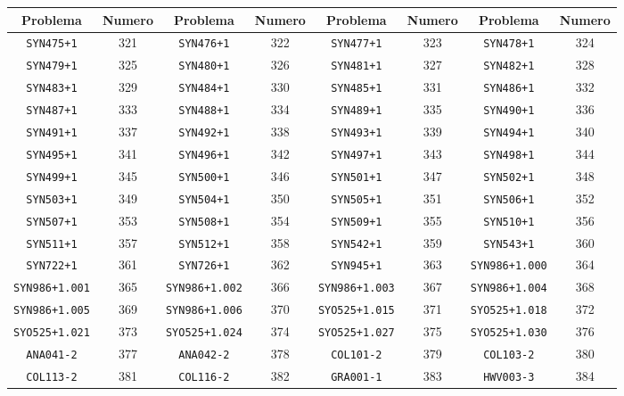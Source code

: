 \documentclass[./main.tex]{subfiles}
\begin{document}
\begin{table}[H]
\begin{tabular}{|c|c|c|c|c|c|c|c|}
\hline
Problema & Numero & Problema & Numero & Problema & Numero & Problema & Numero \\
\hline
\texttt{SYN475+1} & 321 & \texttt{SYN476+1} & 322 & \texttt{SYN477+1} & 323 & \texttt{SYN478+1} & 324\\
\hline
\texttt{SYN479+1} & 325 & \texttt{SYN480+1} & 326 & \texttt{SYN481+1} & 327 & \texttt{SYN482+1} & 328\\
\hline
\texttt{SYN483+1} & 329 & \texttt{SYN484+1} & 330 & \texttt{SYN485+1} & 331 & \texttt{SYN486+1} & 332\\
\hline
\texttt{SYN487+1} & 333 & \texttt{SYN488+1} & 334 & \texttt{SYN489+1} & 335 & \texttt{SYN490+1} & 336\\
\hline
\texttt{SYN491+1} & 337 & \texttt{SYN492+1} & 338 & \texttt{SYN493+1} & 339 & \texttt{SYN494+1} & 340\\
\hline
\texttt{SYN495+1} & 341 & \texttt{SYN496+1} & 342 & \texttt{SYN497+1} & 343 & \texttt{SYN498+1} & 344\\
\hline
\texttt{SYN499+1} & 345 & \texttt{SYN500+1} & 346 & \texttt{SYN501+1} & 347 & \texttt{SYN502+1} & 348\\
\hline
\texttt{SYN503+1} & 349 & \texttt{SYN504+1} & 350 & \texttt{SYN505+1} & 351 & \texttt{SYN506+1} & 352\\
\hline
\texttt{SYN507+1} & 353 & \texttt{SYN508+1} & 354 & \texttt{SYN509+1} & 355 & \texttt{SYN510+1} & 356\\
\hline
\texttt{SYN511+1} & 357 & \texttt{SYN512+1} & 358 & \texttt{SYN542+1} & 359 & \texttt{SYN543+1} & 360\\
\hline
\texttt{SYN722+1} & 361 & \texttt{SYN726+1} & 362 & \texttt{SYN945+1} & 363 & \texttt{SYN986+1.000} & 364\\
\hline
\texttt{SYN986+1.001} & 365 & \texttt{SYN986+1.002} & 366 & \texttt{SYN986+1.003} & 367 & \texttt{SYN986+1.004} & 368\\
\hline
\texttt{SYN986+1.005} & 369 & \texttt{SYN986+1.006} & 370 & \texttt{SYO525+1.015} & 371 & \texttt{SYO525+1.018} & 372\\
\hline
\texttt{SYO525+1.021} & 373 & \texttt{SYO525+1.024} & 374 & \texttt{SYO525+1.027} & 375 & \texttt{SYO525+1.030} & 376\\
\hline
\texttt{ANA041-2} & 377 & \texttt{ANA042-2} & 378 & \texttt{COL101-2} & 379 & \texttt{COL103-2} & 380\\
\hline
\texttt{COL113-2} & 381 & \texttt{COL116-2} & 382 & \texttt{GRA001-1} & 383 & \texttt{HWV003-3} & 384\\

\end{tabular}
\end{table}
\end{document}
